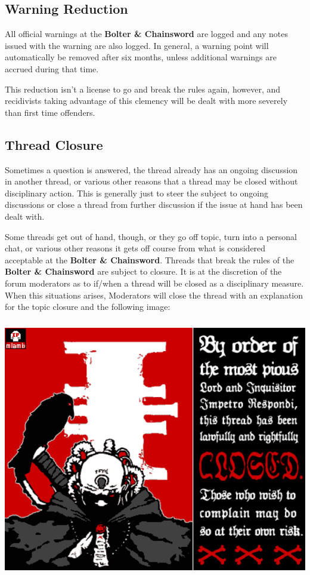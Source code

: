 \documentclass[12pt]{article}
\newcommand{\bnc}{{\textbf{Bolter \& Chainsword}}}%
\begin{document}
\subsection{Warning Reduction}

All official warnings at the {\bnc} are logged and any notes issued with 
the warning are also logged. In general, a warning point will 
automatically be removed after six months, unless additional warnings 
are accrued during that time.

This reduction isn't a license to go and break the rules again, 
however, and recidivists taking advantage of this clemency will be 
dealt with more severely than first time offenders.

\subsection{Thread Closure}

Sometimes a question is answered, the thread already has an ongoing 
discussion in another thread, or various other reasons that a thread 
may be closed without disciplinary action. This is generally just to 
steer the subject to ongoing discussions or close a thread from further 
discussion if the issue at hand has been dealt with.

Some threads get out of hand, though, or they go off topic, turn into a 
personal chat, or various other reasons it gets off course from what is 
considered acceptable at the {\bnc}. Threads that break the rules of the 
{\bnc} are subject to closure. It is at the discretion of the forum 
moderators as to if/when a thread will be closed as a disciplinary 
measure. When this situations arises, Moderators will close the thread 
with an explanation for the topic closure and the following image:

\includegraphics[width=400pt, height=322pt]{closedtopic.png}
\end{document}
